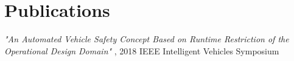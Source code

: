 \documentclass[]{deedy-resume-openfont}
\begin{document}
\begin{minipage}[t]{0.63\textwidth}
\section{Publications}
\textit{"An Automated Vehicle Safety Concept Based on Runtime Restriction of the Operational Design Domain"} , 2018 IEEE Intelligent Vehicles Symposium

\sectionsep








\end{minipage} 
\end{document}
